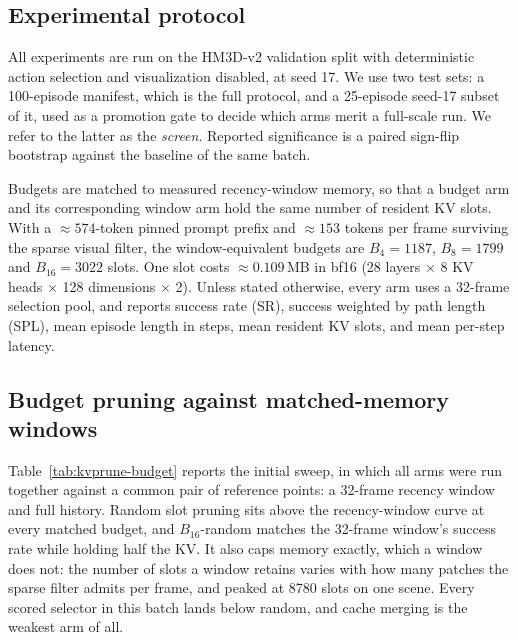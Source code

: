 
\subsection{Experimental protocol}
\label{sec:kvprune-protocol}

All experiments are run on the HM3D-v2 validation split with deterministic action selection
and visualization disabled, at seed 17. We use two test sets: a 100-episode manifest, which
is the full protocol, and a 25-episode seed-17 subset of it, used as a promotion gate to
decide which arms merit a full-scale run. We refer to the latter as the \emph{screen}.
Reported significance is a paired sign-flip bootstrap against the baseline of the same
batch.

Budgets are matched to measured recency-window memory, so that a budget arm and its
corresponding window arm hold the same number of resident KV slots. With a $\approx
574$-token pinned prompt prefix and $\approx 153$ tokens per frame surviving the sparse
visual filter, the window-equivalent budgets are $B_4 = 1187$, $B_8 = 1799$ and $B_{16} =
3022$ slots. One slot costs $\approx 0.109$\,MB in bf16 (28 layers $\times$ 8 KV heads
$\times$ 128 dimensions $\times$ 2). Unless stated otherwise, every arm uses a 32-frame
selection pool, and reports success rate (SR), success weighted by path length (SPL), mean
episode length in steps, mean resident KV slots, and mean per-step latency.

\subsection{Budget pruning against matched-memory windows}
\label{sec:kvprune-budget}

Table~\ref{tab:kvprune-budget} reports the initial sweep, in which all arms were run
together against a common pair of reference points: a 32-frame recency window and full
history. Random slot pruning sits above the recency-window curve at every matched budget,
and $B_{16}$-random matches the 32-frame window's success rate while holding half the KV. It
also caps memory exactly, which a window does not: the number of slots a window retains
varies with how many patches the sparse filter admits per frame, and peaked at 8780 slots on
one scene. Every scored selector in this batch lands below random, and cache merging is the
weakest arm of all.


